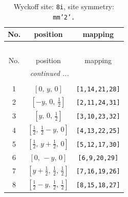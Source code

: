 \documentclass[fleqn,8pt]{jsarticle}
\begin{document}
\begin{longtable}{ccc}
\caption{Wyckoff site: {\tt 8i}, site symmetry: {\tt mm'2'.}}
 \\
 \hline \hline
No. & position & mapping \\ \hline \endfirsthead

\multicolumn{2}{l}{\tablename\ \thetable{}} \\
 \hline \hline
No. & position & mapping \\ \hline \endhead

 \hline \hline
\multicolumn{2}{r}{\footnotesize\it continued ...} \\ \endfoot

 \hline \hline
\multicolumn{2}{r}{} \\ \endlastfoot

1 & $\left[ 0,\, y,\, 0 \right]$ & {\tt [1,14,21,28]} \\ \hline
2 & $\left[ - y,\, 0,\, \frac{1}{2} \right]$ & {\tt [2,11,24,31]} \\ \hline
3 & $\left[ y,\, 0,\, \frac{1}{2} \right]$ & {\tt [3,10,23,32]} \\ \hline
4 & $\left[ \frac{1}{2},\, \frac{1}{2} - y,\, 0 \right]$ & {\tt [4,13,22,25]} \\ \hline
5 & $\left[ \frac{1}{2},\, y + \frac{1}{2},\, 0 \right]$ & {\tt [5,12,17,30]} \\ \hline
6 & $\left[ 0,\, - y,\, 0 \right]$ & {\tt [6,9,20,29]} \\ \hline
7 & $\left[ y + \frac{1}{2},\, \frac{1}{2},\, \frac{1}{2} \right]$ & {\tt [7,16,19,26]} \\ \hline
8 & $\left[ \frac{1}{2} - y,\, \frac{1}{2},\, \frac{1}{2} \right]$ & {\tt [8,15,18,27]} \\
\end{longtable}
\renewcommand{\arraystretch}{1.2}
\end{document}
